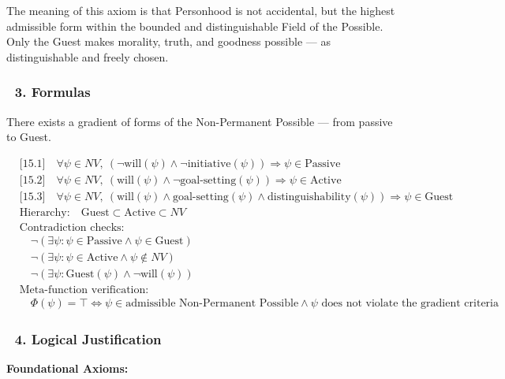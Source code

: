 \documentclass[12pt]{article}
\begin{document}
The meaning of this axiom is that Personhood is not accidental, but the highest admissible form within the bounded and distinguishable Field of the Possible. Only the Guest makes morality, truth, and goodness possible — as distinguishable and freely chosen.

\subsubsection*{🔹 3. Formulas}

There exists a gradient of forms of the Non-Permanent Possible — from passive to Guest.

\[
\begin{aligned}
&\text{[15.1]} \quad \forall \psi \in NV,\ (\neg \text{will}(\psi) \wedge \neg \text{initiative}(\psi)) \Rightarrow \psi \in \text{Passive} \\
&\text{[15.2]} \quad \forall \psi \in NV,\ (\text{will}(\psi) \wedge \neg \text{goal-setting}(\psi)) \Rightarrow \psi \in \text{Active} \\
&\text{[15.3]} \quad \forall \psi \in NV,\ (\text{will}(\psi) \wedge \text{goal-setting}(\psi) \wedge \text{distinguishability}(\psi)) \Rightarrow \psi \in \text{Guest} \\
&\text{Hierarchy:} \quad \text{Guest} \subset \text{Active} \subset NV \\
&\text{Contradiction checks:} \\
&\quad \neg(\exists \psi : \psi \in \text{Passive} \wedge \psi \in \text{Guest}) \\
&\quad \neg(\exists \psi : \psi \in \text{Active} \wedge \psi \notin NV) \\
&\quad \neg(\exists \psi : \text{Guest}(\psi) \wedge \neg \text{will}(\psi)) \\
&\text{Meta-function verification:} \\
&\quad \Phi(\psi) = \top \iff \psi \in \text{admissible Non-Permanent Possible} \wedge \psi \text{ does not violate the gradient criteria}
\end{aligned}
\]

\subsubsection*{🔹 4. Logical Justification}

\textbf{Foundational Axioms:}
\end{document}
